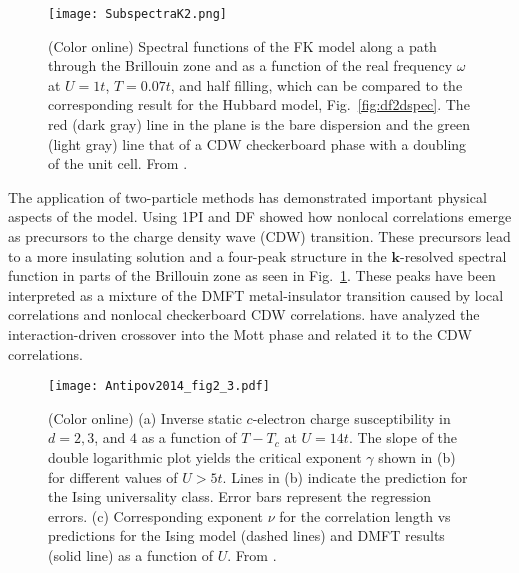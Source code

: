 \documentclass[rmp,aps,reprint,amsmath,amssymb,superscriptaddress,showpacs,nofootinbib]{revtex4-1}
\begin{document}
\begin{figure}[t]
  \texttt{[image: SubspectraK2.png]}
    \caption{(Color online) Spectral functions of the FK model along a path through the Brillouin zone and as a function of the real frequency $\omega$ at $U=1t$, $T = 0.07t$, and half filling, which can be compared to the corresponding result for the Hubbard model, Fig.~\ref{fig:df2dspec}. The red (dark gray) line in the plane is the bare dispersion and the green (light gray) line that of a CDW checkerboard phase with a doubling of the unit cell. From .}
  \label{FKM:Spectrum}
\end{figure}

The application of two-particle methods has demonstrated important physical aspects of the model.  
Using 1PI and DF  showed how nonlocal correlations emerge as precursors to the charge density wave (CDW) transition. These precursors lead to a more insulating  solution and a four-peak structure in the ${\mathbf k}$-resolved spectral function in parts of the Brillouin zone as seen in Fig.~\ref{FKM:Spectrum}. These peaks have been interpreted as a mixture of the DMFT metal-insulator  transition  caused  by  local  correlations and nonlocal checkerboard CDW correlations.  have analyzed the interaction-driven crossover into the Mott phase and  related it to the CDW correlations.

\begin{figure}[t]
  \texttt{[image: Antipov2014\_fig2\_3.pdf]}
    \caption{(Color online) (a) Inverse static $c$-electron charge susceptibility in $d=2,3$, and $4$ as a function of $T-T_c$ at $U=14t$. The slope of the double logarithmic plot yields the critical exponent $\gamma$  shown in (b) for different values of  $U > 5t$. Lines in (b) indicate the prediction for the Ising universality class. Error bars represent the regression errors. (c) Corresponding exponent $\nu$ for the correlation length  vs predictions for the Ising model (dashed lines) and DMFT results (solid line) as a function of $U$. From .}
  \label{Method_FKM:Antipov2014_fig2_3}
\end{figure}
\end{document}
